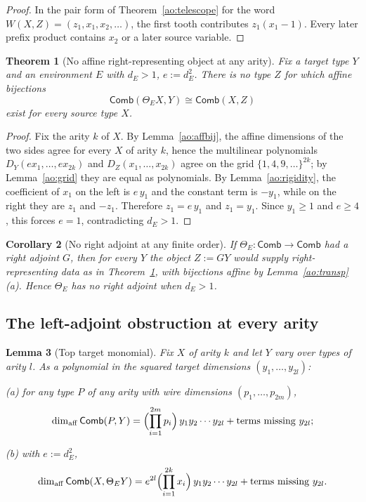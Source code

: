\documentclass[11pt,a4paper]{article}
\theoremstyle{definition}
\theoremstyle{plain}
\newtheorem{theorem}{Theorem}[section]
\newtheorem{lemma}[theorem]{Lemma}
\newtheorem{corollary}[theorem]{Corollary}
\theoremstyle{remark}
\newcommand{\Comb}{\mathsf{Comb}}
\newcommand{\affdim}{\dim_{\mathrm{aff}}}
\begin{document}
\begin{proof}
In the pair form of Theorem~\ref{ao:telescope} for the word
$W(X,Z)=(z_1,x_1,x_2,\dots)$, the first tooth contributes $z_1(x_1-1)$.
Every later prefix product contains $x_2$ or a later source variable.
\end{proof}

\begin{theorem}[No affine right-representing object at any arity]
\label{ao:right-thm}
Fix a target type $Y$ and an environment $E$ with $d_E>1$, $e:=d_E^2$.
There is no type $Z$ for which affine bijections
\[
\Comb(\Theta_E X,Y)\cong\Comb(X,Z)
\]
exist for every source type $X$.
\end{theorem}

\begin{proof}
Fix the arity $k$ of $X$. By Lemma~\ref{ao:affbij}, the affine dimensions
of the two sides agree for every $X$ of arity $k$, hence the multilinear
polynomials $D_Y(e x_1,\dots,e x_{2k})$ and $D_Z(x_1,\dots,x_{2k})$ agree
on the grid $\{1,4,9,\dots\}^{2k}$; by Lemma~\ref{ao:grid} they are equal
as polynomials. By Lemma~\ref{ao:rigidity}, the coefficient of $x_1$ on
the left is $e\,y_1$ and the constant term is $-y_1$, while on the right
they are $z_1$ and $-z_1$. Therefore $z_1=e\,y_1$ and $z_1=y_1$. Since
$y_1\ge 1$ and $e\ge 4$, this forces $e=1$, contradicting $d_E>1$.
\end{proof}

\begin{corollary}[No right adjoint at any finite order]
\label{ao:right-cor}
If $\Theta_E:\Comb\to\Comb$ had a right adjoint $G$, then for every $Y$ the
object $Z:=GY$ would supply right-representing data as in
Theorem~\ref{ao:right-thm}, with bijections affine by
Lemma~\ref{ao:transp}(a). Hence $\Theta_E$ has no right adjoint when
$d_E>1$.
\end{corollary}

\subsection{The left-adjoint obstruction at every arity}
\label{ao:left}

\begin{lemma}[Top target monomial]
\label{ao:topmonomial}
Fix $X$ of arity $k$ and let $Y$ vary over types of arity $l$. As a
polynomial in the squared target dimensions $(y_1,\dots,y_{2l})$:

\emph{(a)} for any type $P$ of any arity with wire dimensions
$(p_1,\dots,p_{2m})$,
\[
\affdim\Comb(P,Y)=\Bigl(\prod_{i=1}^{2m}p_i\Bigr)\,y_1y_2\cdots y_{2l}
+\text{terms missing }y_{2l};
\]

\emph{(b)} with $e:=d_E^2$,
\[
\affdim\Comb(X,\Theta_EY)
=e^{2l}\Bigl(\prod_{i=1}^{2k}x_i\Bigr)\,y_1y_2\cdots y_{2l}
+\text{terms missing }y_{2l}.
\]
\end{lemma}
\end{document}
